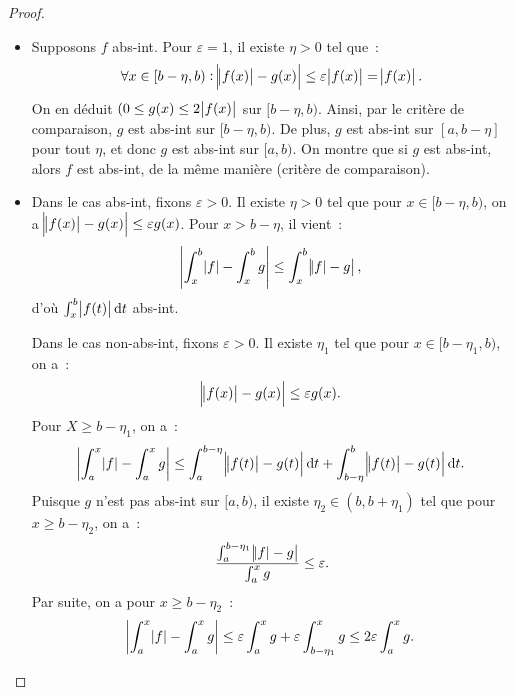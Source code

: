 \documentclass{report}
\theoremstyle{definition}
\theoremstyle{remark}
\numberwithin{equation}{section}
\begin{document}
			\begin{proof}~
			\begin{itemize}
				\item Supposons $f$ abs-int. Pour $\varepsilon = 1$, il existe $\eta > 0$ tel que~:
				\begin{equation}
					\forall x \in [b - \eta, b) : \abs {\abs {f(x)} - g(x)} \leq \varepsilon \abs {f(x)} = \abs {f(x)}.
				\end{equation}
				On en déduit $(0 \leq g(x) \leq 2\abs {f(x)}$ sur $[b-\eta, b)$. Ainsi, par le critère de comparaison, $g$ est abs-int sur $[b-\eta, b)$. De plus,
				$g$ est abs-int sur $[a, b-\eta]$ pour tout $\eta$, et donc $g$ est abs-int sur $[a, b)$. On montre que si $g$ est abs-int, alors $f$ est abs-int, de la
				même manière (critère de comparaison).
				\item Dans le cas abs-int, fixons $\varepsilon > 0$. Il existe $\eta > 0$ tel que pour $x \in [b-\eta, b)$, on a
				$\abs {\abs {f(x)}-g(x)} \leq \varepsilon g(x)$. Pour $x > b-\eta$, il vient~:
				\begin{equation}
					\abs {\int_x^b\abs f - \int_x^b g} \leq \int_x^b\abs {\abs f - g},
				\end{equation}
				d'où $\int_x^b\abs {f(t)}\dif t$ abs-int.

				Dans le cas non-abs-int, fixons $\varepsilon > 0$. Il existe $\eta_1$ tel que pour $x \in [b-\eta_1, b)$, on a~:
				\begin{equation}
					\abs {\abs {f(x)} - g(x)} \leq \varepsilon g(x).
				\end{equation}
				Pour $X \geq b-\eta_1$, on a~:
				\begin{equation}
					\abs {\int_a^x \abs f - \int_a^x g} \leq \int_a^{b- \eta}\abs {\abs {f(t)} - g(t)}\dif t + \int_{b-\eta}^b\abs {\abs {f(t)} - g(t)}\dif t.
				\end{equation}
				Puisque $g$ n'est pas abs-int sur $[a, b)$, il existe $\eta_2 \in (b, b+\eta_1)$ tel que pour $x \geq b-\eta_2$, on a~:
				\begin{equation}
					\frac {\int_a^{b-\eta_1}\abs {\abs f - g}}{\int_a^x g} \leq \varepsilon.
				\end{equation}
				Par suite, on a pour $x \geq b - \eta_2$~:
				\begin{equation}
					\abs {\int_a^x \abs f - \int_a^x g} \leq \varepsilon \int_a^xg + \varepsilon\int_{b-\eta_1}^x g \leq 2\varepsilon \int_a^x g.
				\end{equation}
			\end{itemize}
			\end{proof}
\end{document}
